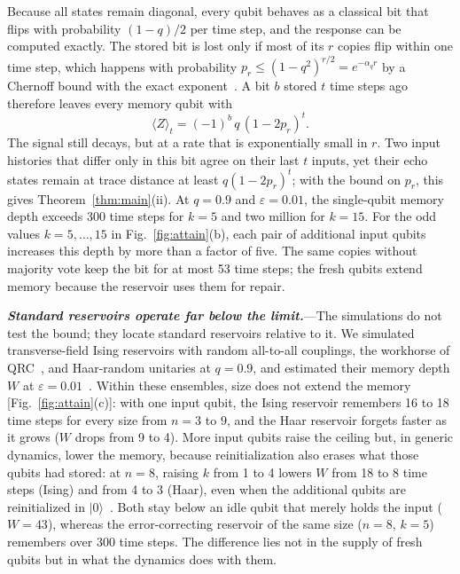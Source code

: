 \documentclass[aps,prl,twocolumn,superscriptaddress,floatfix]{revtex4-2}
\theoremstyle{plain}
\newcommand{\ket}[1]{|#1\rangle}
\newcommand{\runin}[1]{\textit{\textbf{#1}}---}
\begin{document}
Because all states remain diagonal, every qubit behaves as a classical bit that flips with probability $(1-q)/2$ per time step, and the response can be computed exactly. The stored bit is lost only if most of its $r$ copies flip within one time step, which happens with probability $p_r\le(1-q^2)^{r/2}=e^{-\alpha_qr}$ by a Chernoff bound with the exact exponent~\cite[Sec.~V]{SM}. A bit $b$ stored $t$ time steps ago therefore leaves every memory qubit with
\begin{equation}
\langle Z\rangle_t=(-1)^b\,q\,(1-2p_r)^t .
\label{eq:response}
\end{equation}
The signal still decays, but at a rate that is exponentially small in $r$. Two input histories that differ only in this bit agree on their last $t$ inputs, yet their echo states remain at trace distance at least $q(1-2p_r)^t$; with the bound on $p_r$, this gives Theorem~\ref{thm:main}(ii). At $q=0.9$ and $\varepsilon=0.01$, the single-qubit memory depth exceeds 300 time steps for $k=5$ and two million for $k=15$. For the odd values $k=5,\ldots,15$ in Fig.~\ref{fig:attain}(b), each pair of additional input qubits increases this depth by more than a factor of five. The same copies without majority vote keep the bit for at most 53 time steps; the fresh qubits extend memory because the reservoir uses them for repair.

\runin{Standard reservoirs operate far below the limit.}The simulations do not test the bound; they locate standard reservoirs relative to it. We simulated transverse-field Ising reservoirs with random all-to-all couplings, the workhorse of QRC~\cite{Fujii2017,Nakajima2019,MartinezPena2021}, and Haar-random unitaries at $q=0.9$, and estimated their memory depth $W$ at $\varepsilon=0.01$~\cite{SM}. Within these ensembles, size does not extend the memory [Fig.~\ref{fig:attain}(c)]: with one input qubit, the Ising reservoir remembers 16 to 18 time steps for every size from $n=3$ to $9$, and the Haar reservoir forgets faster as it grows ($W$ drops from 9 to 4). More input qubits raise the ceiling but, in generic dynamics, lower the memory, because reinitialization also erases what those qubits had stored: at $n=8$, raising $k$ from 1 to 4 lowers $W$ from 18 to 8 time steps (Ising) and from 4 to 3 (Haar), even when the additional qubits are reinitialized in $\ket0$~\cite{SM}. Both stay below an idle qubit that merely holds the input ($W=43$), whereas the error-correcting reservoir of the same size ($n=8$, $k=5$) remembers over 300 time steps. The difference lies not in the supply of fresh qubits but in what the dynamics does with them.
\end{document}
